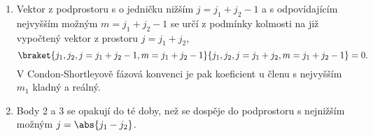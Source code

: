 \begin{solution}
\begin{enumerate}
		\item
			Vektor z podprostoru s o jedničku nižším $j=j_{1}+j_{2}-1$ a s odpovídajícím nejvyšším možným $m=j_{1}+j_{2}-1$ se určí z podmínky kolmosti na již vypočtený vektor z prostoru $j=j_{1}+j_{2}$,
			\begin{equation}
				\braket{j_{1},j_{2},j=j_{1}+j_{2}-1,m=j_{1}+j_{2}-1}
					{j_{1},j_{2},j=j_{1}+j_{2},m=j_{1}+j_{2}-1}=0.
			\end{equation}
			V Condon-Shortleyově fázová konvenci je pak koeficient u členu s nejvyšším $m_{1}$ kladný a reálný.
		
		\item
			Body 2 a 3 se opakují do té doby, než se dospěje do podprostoru s nejnižším možným $j=\abs{j_{1}-j_{2}}$.
	\end{enumerate}	

\end{solution}
